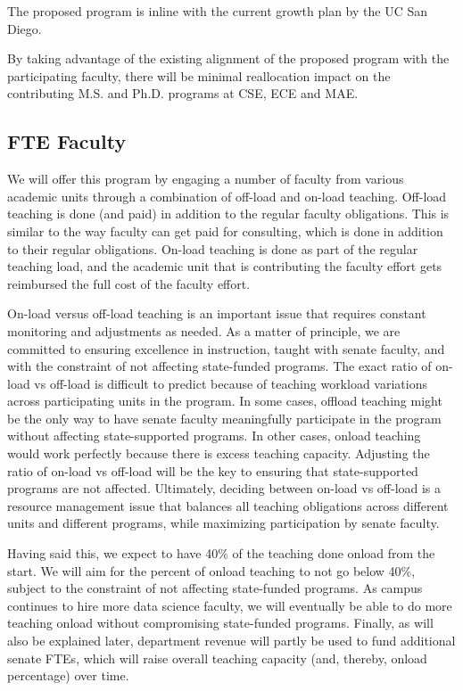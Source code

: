 \documentclass[11pt,letterpaper]{article}
\begin{document}
The proposed program is inline with the current growth plan by the UC
San Diego. 

By taking advantage of the existing alignment of the proposed program
with the participating faculty, there will be minimal reallocation
impact on the contributing M.S. and Ph.D. programs at CSE, ECE and
MAE. 

\subsection{FTE Faculty}

We will offer this program by engaging a number of faculty from
various academic units through a combination of off-load and on-load
teaching. Off-load teaching is done (and paid) in addition to the
regular faculty obligations. This is similar to the way faculty can
get paid for consulting, which is done in addition to their regular
obligations. On-load teaching is done as part of the regular teaching
load, and the academic unit that is contributing the faculty effort
gets reimbursed the full cost of the faculty effort.

On-load versus off-load teaching is an important issue that requires
constant monitoring and adjustments as needed. As a matter of
principle, we are committed to ensuring excellence in instruction,
taught with senate faculty, and with the constraint of not affecting
state-funded programs. The exact ratio of on-load vs off-load is
difficult to predict because of teaching workload variations across
participating units in the program. In some cases, offload teaching
might be the only way to have senate faculty meaningfully participate
in the program without affecting state-supported programs. In other
cases, onload teaching would work perfectly because there is excess
teaching capacity. Adjusting the ratio of on-load vs off-load will be
the key to ensuring that state-supported programs are not affected.
Ultimately, deciding between on-load vs off-load is a resource
management issue that balances all teaching obligations across
different units and different programs, while maximizing participation
by senate faculty.

Having said this, we expect to have 40\% of the teaching done onload
from the start. We will aim for the percent of onload teaching to not
go below 40\%, subject to the constraint of not affecting state-funded
programs. As campus continues to hire more data science faculty, we
will eventually be able to do more teaching onload without
compromising state-funded programs. Finally, ​as will also be explained
later, department revenue will partly be used to fund additional
senate FTEs, which will raise overall teaching capacity (and, thereby,
onload percentage) over time.
\end{document}
